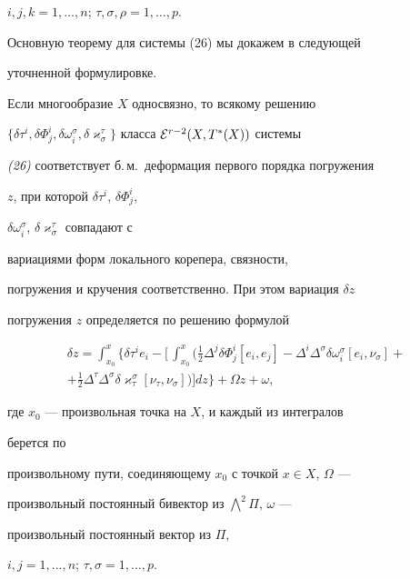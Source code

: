 $i,j,k=1,\dotsc,n$; $\tau,\sigma,\rho=1,\dotsc,p$.


Основную теорему для системы (26) мы докажем в следующей


уточненной формулировке.





\begin{thm}


Если многообразие $X$ односвязно, то всякому решению


$\{\delta\tau^i, \delta\Phi^i_j, \delta\omega^{\sigma}_i,


\delta\varkappa^{\tau}_{\sigma}\}$ класса ${\cal E}^{r-2}(X,T^*(X))$ системы


{\em (26)} соответствует б.\,м.~деформация первого порядка погружения


$z$, при которой $\delta\tau^i$, $\delta\Phi^i_j$,


$\delta\omega^{\sigma}_i$, $\delta\varkappa^{\tau}_{\sigma}$ совпадают с


вариациями форм локального корепера, связности,


погружения и кручения соответственно. При этом вариация $\delta z$


погружения $z$ определяется по решению формулой


\begin{multline}


\delta z =


\int_{x_0}^{x}\biggl\{\delta\tau^ie_i-\biggl[\,\int_{x_0}^x


\biggl(\frac{1}{2}\Delta^j


\delta\Phi^i_j[e_i,e_j]-\Delta^i\Delta^{\sigma}\delta\omega^{\sigma}_i


[e_i,\nu_{\sigma}]+\\


+\frac{1}{2}\Delta^{\tau}\Delta^{\sigma}


\delta\varkappa_{\tau}^{\sigma}[\nu_{\tau},\nu_{\sigma}]\biggr)\biggr]


dz\biggr\}+\Omega z+\omega,


\end{multline}


где $x_0$ --- произвольная точка на $X$, и каждый из интегралов


берется по


произвольному пути, соединяющему $x_0$ с точкой $x\in X$, $\Omega$ ---


произвольный постоянный бивектор из $\bigwedge^2\Pi$, $\omega$ ---


произвольный постоянный вектор из $\Pi$,


$i,j=1,\dotsc,n$; $\tau,\sigma=1,\dotsc,p$.


\end{thm}





